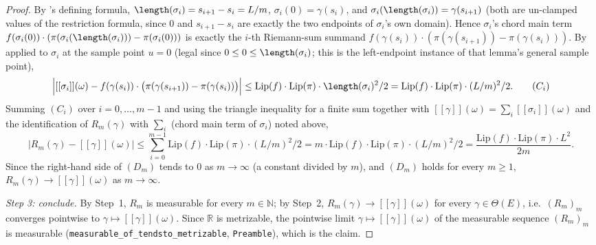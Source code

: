 \begin{proof}
  By 's defining formula, $\length(\sigma_i) = s_{i+1}-s_i = L/m$,
  $\sigma_i(0) = \gamma(s_i)$, and $\sigma_i(\length(\sigma_i)) = \gamma(s_{i+1})$ (both are
  un-clamped values of the restriction formula, since $0$ and $s_{i+1}-s_i$ are exactly the two
  endpoints of $\sigma_i$'s own domain). Hence $\sigma_i$'s chord main term
  $f(\sigma_i(0))\cdot(\pi(\sigma_i(\length(\sigma_i))) - \pi(\sigma_i(0)))$ is exactly the $i$-th
  Riemann-sum summand $f(\gamma(s_i))\cdot(\pi(\gamma(s_{i+1}))-\pi(\gamma(s_i)))$. By
   applied to $\sigma_i$ at the sample point $u=0$ (legal since
  $0 \le 0 \le \length(\sigma_i)$; this is the left-endpoint instance of that lemma's general
  sample point),
  \[
    \Bigl| [[\sigma_i]](\omega) - f(\gamma(s_i))\cdot\bigl(\pi(\gamma(s_{i+1}))-\pi(\gamma(s_i))\bigr)
    \Bigr| \le \mathrm{Lip}(f)\cdot\mathrm{Lip}(\pi)\cdot \length(\sigma_i)^2/2
      = \mathrm{Lip}(f)\cdot\mathrm{Lip}(\pi)\cdot (L/m)^2/2
    . \tag{$C_i$}
  \]
  Summing $(C_i)$ over $i=0,\dots,m-1$ and using the triangle inequality for a finite sum together
  with $[[\gamma]](\omega) = \sum_i [[\sigma_i]](\omega)$ and the identification of $R_m(\gamma)$
  with $\sum_i$ (chord main term of $\sigma_i$) noted above,
  \[
    \bigl| R_m(\gamma) - [[\gamma]](\omega) \bigr|
      \le \sum_{i=0}^{m-1} \mathrm{Lip}(f)\cdot\mathrm{Lip}(\pi)\cdot(L/m)^2/2
      = m \cdot \mathrm{Lip}(f)\cdot\mathrm{Lip}(\pi)\cdot (L/m)^2/2
      = \frac{\mathrm{Lip}(f)\cdot\mathrm{Lip}(\pi)\cdot L^2}{2m}
    . \tag{$D_m$}
  \]
  Since the right-hand side of $(D_m)$ tends to $0$ as $m \to \infty$ (a constant divided by $m$),
  and $(D_m)$ holds for every $m \ge 1$, $R_m(\gamma) \to [[\gamma]](\omega)$ as $m \to \infty$.

  \emph{Step 3: conclude.} By Step~1, $R_m$ is measurable for every $m \in \mathbb{N}$; by Step~2,
  $R_m(\gamma) \to [[\gamma]](\omega)$ for every $\gamma \in \Theta(E)$, i.e.\ $(R_m)_{m}$ converges
  pointwise to $\gamma \mapsto [[\gamma]](\omega)$. Since $\mathbb{R}$ is metrizable, the pointwise
  limit $\gamma \mapsto [[\gamma]](\omega)$ of the measurable sequence $(R_m)_m$ is measurable
  (\texttt{measurable\_of\_tendsto\_metrizable}, \texttt{Preamble}), which is the claim.
\end{proof}
